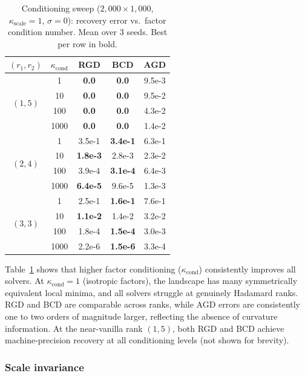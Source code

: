 \documentclass[letterpaper, 10 pt, conference]{ieeeconf}
\theoremstyle{plain}
\theoremstyle{definition}
\theoremstyle{remark}
\begin{document}
\begin{table}[t]
\centering
\caption{Conditioning sweep ($2{,}000{\times}1{,}000$, $\kappa_{\mathrm{scale}}{=}1$, $\sigma{=}0$): recovery error vs.\ factor condition number.
Mean over 3 seeds.  Best per row in bold.}
\label{tab:conditioning}
\small
\begin{tabular}{@{}c c c c c@{}}
\toprule
$(r_1,r_2)$ & $\kappa_{\mathrm{cond}}$ & RGD & BCD & AGD \\
\midrule
\multirow{4}{*}{$(1,5)$}
  & 1    & \textbf{0.0} & \textbf{0.0} & 9.5e-3 \\
  & 10   & \textbf{0.0} & \textbf{0.0} & 9.5e-2 \\
  & 100  & \textbf{0.0} & \textbf{0.0} & 4.3e-2 \\
  & 1000 & \textbf{0.0} & \textbf{0.0} & 1.4e-2 \\
\midrule
\multirow{4}{*}{$(2,4)$}
  & 1    & 3.5e-1 & \textbf{3.4e-1} & 6.3e-1 \\
  & 10   & \textbf{1.8e-3} & 2.8e-3 & 2.3e-2 \\
  & 100  & 3.9e-4 & \textbf{3.1e-4} & 6.4e-3 \\
  & 1000 & \textbf{6.4e-5} & 9.6e-5 & 1.3e-3 \\
\midrule
\multirow{4}{*}{$(3,3)$}
  & 1    & 2.5e-1 & \textbf{1.6e-1} & 7.6e-1 \\
  & 10   & \textbf{1.1e-2} & 1.4e-2 & 3.2e-2 \\
  & 100  & 1.8e-4 & \textbf{1.5e-4} & 3.0e-3 \\
  & 1000 & 2.2e-6 & \textbf{1.5e-6} & 3.3e-4 \\
\bottomrule
\end{tabular}
\end{table}

Table~\ref{tab:conditioning} shows that higher factor conditioning ($\kappa_{\mathrm{cond}}$) consistently improves all solvers.
At $\kappa_{\mathrm{cond}}{=}1$ (isotropic factors), the landscape has many symmetrically equivalent local minima, and all solvers struggle at genuinely Hadamard ranks.
RGD and BCD are comparable across ranks, while AGD errors are consistently one to two orders of magnitude larger, reflecting the absence of curvature information.
At the near-vanilla rank $(1,5)$, both RGD and BCD achieve machine-precision recovery at all conditioning levels (not shown for brevity).

\subsubsection{Scale invariance}
\end{document}
